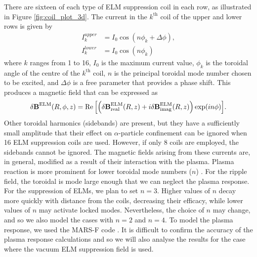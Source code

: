 \documentclass[10pt, a4paper, twoside]{article}
\begin{document}
There are sixteen of each type of ELM suppression coil in each row, as illustrated in Figure \ref{fig:coil_plot_3d}. The current in the $k^\text{th}$ coil of the upper and lower rows is given by
\begin{align}
    \label{eq:ELM_coilcurrent_profile_upper}
    I_k^{upper} &= I_0 \cos(n \phi_k + \Delta \phi), \\
    \label{eq:ELM_coilcurrent_profile_lower}
    I_k^{lower} &= I_0 \cos(n \phi_k)
\end{align}
where $k$ ranges from 1 to 16, $I_0$ is the maximum current value, $\phi_k$ is the toroidal angle of the centre of the $k^\text{th}$ coil, $n$ is the principal toroidal mode number chosen to be excited, and $\Delta \phi$ is a free parameter that provides a phase shift. This produces a magnetic field that can be expressed as
\begin{equation}
    \delta\textbf{B}^\text{ELM}(R, \phi, z)=\Re\qty[\qty(\delta\textbf{B}^\text{ELM}_\text{real}(R,z) + i\delta\textbf{B}^\text{ELM}_\text{imag}(R,z))\exp(in\phi)].
\end{equation}
Other toroidal harmonics (sidebands) are present, but they have a sufficiently small amplitude that their effect on $\alpha$-particle confinement can be ignored when 16 ELM suppression coils are used. However, if only 8 coils are employed, the sidebands cannot be ignored. The magnetic fields arising from these currents are, in general, modified as a result of their interaction with the plasma. Plasma reaction is more prominent for lower toroidal mode numbers ($n$) \cite{mcclements2005}. For the ripple field, the toroidal is mode large enough that we can neglect the plasma response. For the suppression of ELMs, we plan to set $n=3$. Higher values of $n$ decay more quickly with distance from the coils, decreasing their efficacy, while lower values of $n$ may activate locked modes. Nevertheless, the choice of $n$ may change, and so we also model the cases with $n=2$ and $n=4$. To model the plasma response, we used the MARS-F code \cite{liu2015}. It is difficult to confirm the accuracy of the plasma response calculations and so we will also analyse the results for the case where the vacuum ELM suppression field is used.
\end{document}
